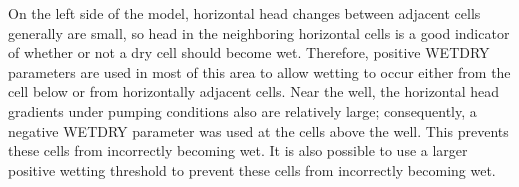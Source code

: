 On the left side of the model, horizontal head changes between adjacent cells generally are small, so head in the neighboring horizontal cells is a good indicator of whether or not a dry cell should become wet. Therefore, positive WETDRY parameters are used in most of this area to allow wetting to occur either from the cell below or from horizontally adjacent cells. Near the well, the horizontal head gradients under pumping conditions also are relatively large; consequently, a negative WETDRY parameter was used at the cells above the well. This prevents these cells from incorrectly becoming wet. It is also possible to use a larger positive wetting threshold to prevent these cells from incorrectly becoming wet.

